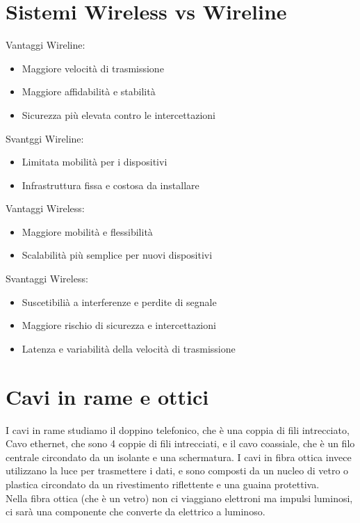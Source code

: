 \section{Sistemi Wireless vs Wireline}

Vantaggi Wireline:
\begin{itemize}
    \item Maggiore velocità di trasmissione
    \item Maggiore affidabilità e stabilità
    \item Sicurezza più elevata contro le intercettazioni
\end{itemize}
Svantggi Wireline:
\begin{itemize}
    \item Limitata mobilità per i dispositivi
    \item Infrastruttura fissa e costosa da installare
\end{itemize}
Vantaggi Wireless:
\begin{itemize}
    \item Maggiore mobilità e flessibilità
    \item Scalabilità più semplice per nuovi dispositivi
\end{itemize}
Svantaggi Wireless:
\begin{itemize}
    \item Suscetibilià a interferenze e perdite di segnale
    \item Maggiore rischio di sicurezza e intercettazioni
    \item Latenza e variabilità della velocità di trasmissione
\end{itemize}

\section{Cavi in rame e ottici}
I cavi in rame studiamo il doppino telefonico, che è una coppia di fili intrecciato, 
Cavo ethernet, che sono 4 coppie di fili intrecciati, e il cavo coassiale, che è un filo centrale circondato da un isolante e una schermatura.
I cavi in fibra ottica invece utilizzano la luce per trasmettere i dati, e sono composti da un nucleo di vetro o plastica circondato da un rivestimento riflettente e una guaina protettiva.\\

Nella fibra ottica (che è un vetro) non ci viaggiano elettroni ma impulsi luminosi, ci sarà una componente
che converte da elettrico a luminoso.

